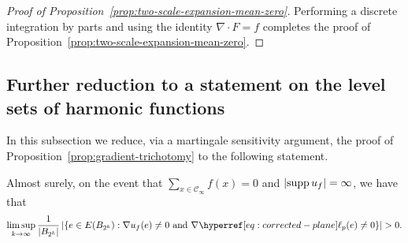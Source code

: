 \documentclass[12pt]{amsart}
\numberwithin{equation}{section}
\begin{document}
\begin{proof}[Proof of Proposition~\ref{prop:two-scale-expansion-mean-zero}]
		Performing a discrete integration by parts and using the identity $\nabla \cdot F = f$ completes the proof of Proposition~\ref{prop:two-scale-expansion-mean-zero}.
	\end{proof}
	
	
	\subsection{Further reduction to a statement on the level sets of harmonic functions}
	In this subsection we reduce, via a martingale sensitivity argument,  the proof of Proposition~\ref{prop:gradient-trichotomy} to the following statement.
	\begin{prop} \label{prop:level-set-of-harmonic-function}
		Almost surely, on the event that $\sum_{x \in \mathscr{C}_{\infty}} f(x) = 0$ and $|\mathrm{supp\,} u_f| = \infty$, we have that 
		\begin{equation} \label{eq:level-set-of-harmonic-function}
			\limsup_{k \to \infty}  \frac{1}{|B_{2^k}|} \left| \left\{ e \in E(B_{2^k}) : \nabla u_f(e) \neq 0 \mbox{ and }  \nabla \ellp{p}(e) \neq 0  \right\} \right|  > 0.
		\end{equation}
	\end{prop}
\end{document}
